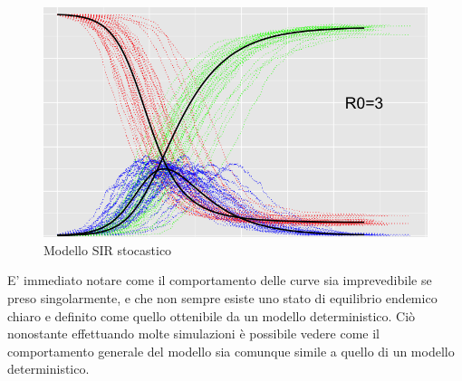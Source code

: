 \begin{figure}[h]
    \begin{center}
        \includegraphics[width=\linewidth]{img/Gillespie-e1643395123662.png}
        \caption{Modello SIR stocastico}
        \label{fig:Endemic_equilibrium_stochastic_sir}
    \end{center}
\end{figure}

E' immediato notare come il comportamento delle curve sia 
imprevedibile se preso singolarmente, e che non sempre 
esiste uno stato di equilibrio endemico chiaro e definito come
quello ottenibile da un modello deterministico. Ciò nonostante 
effettuando molte simulazioni è possibile vedere come il 
comportamento generale del modello sia comunque simile a 
quello di un modello deterministico.